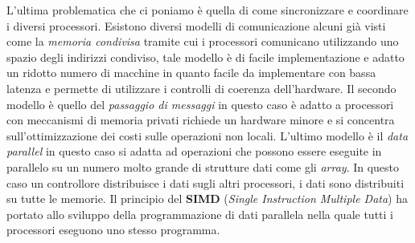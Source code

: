 L'ultima problematica che ci poniamo è quella di come sincronizzare e coordinare i diversi processori. Esistono diversi modelli di comunicazione alcuni già visti come la \emph{memoria condivisa} tramite cui i processori comunicano utilizzando uno spazio degli indirizzi condiviso, tale modello è di facile implementazione e adatto un ridotto numero di macchine in quanto facile da implementare con bassa latenza e permette di utilizzare i controlli di coerenza dell'hardware. Il secondo modello è quello del \emph{passaggio di messaggi} in questo caso è adatto a processori con meccanismi di memoria privati richiede un hardware minore e si concentra sull'ottimizzazione dei costi sulle operazioni non locali. L'ultimo modello è il \emph{data parallel} in questo caso si adatta ad operazioni che possono essere eseguite in parallelo su un numero molto grande di strutture dati come gli \emph{array}. In questo caso un controllore distribuisce i dati sugli altri processori, i dati sono distribuiti su tutte le memorie. Il principio del \textbf{SIMD} (\emph{Single Instruction Multiple Data}) ha portato allo sviluppo della programmazione di dati parallela nella quale tutti i processori eseguono uno stesso programma.
